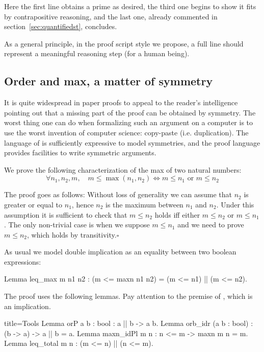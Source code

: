 Here the first line obtains a prime  as desired, the third
one begins to show it fits by contrapositive reasoning, and the
last one, already commented in section~\ref{sec:quantifiedst}, concludes.

As a general principle, in the proof script style we propose, a full
line should represent a meaningful reasoning step (for a human being).


\subsection{Order and max, a matter of symmetry}\label{sec:leqmax}

It is quite widespread in paper proofs to appeal to the reader's intelligence
pointing out that a missing part of the proof can be obtained by symmetry.
The worst thing one can do when formalizing such an argument on a computer
is to use the worst invention of computer science: copy-paste (i.e.
duplication).  The language of
\Coq{} is sufficiently expressive to model symmetries, and the
\mcbSSR{} proof language provides facilities to write symmetric arguments.

We prove the following characterization of the max of two natural numbers:
\[
\forall n_1, n_2, m, \quad m \le \max(n_1,n_2)
\Leftrightarrow m \le n_1 \textrm{ or } m \le n_2
\]

The proof goes as follows: Without loss of generality we can assume that
$n_2$ is greater or equal to $n_1$, hence $n_2$ is the maximum between
$n_1$ and $n_2$.  Under this assumption it is sufficient to check
that $m \le n_2$ holds iff either $m \le n_2$ or $m \le n_1$.
The only non-trivial case is when we suppose $m \le n_1$ and
we need to prove $m \le n_2$, which holds by transitivity.\hfill$\square$

As usual we model double implication as an equality between two
boolean expressions:

\begin{coq}{}{}
Lemma leq_max m n1 n2 : (m <= maxn n1 n2) = (m <= n1) || (m <= n2).
\end{coq}

The proof uses the following lemmas.  Pay attention to the premise of
, which is an implication.

\begin{coq}{}{title=Tools}
Lemma orP {a b : bool} : a || b -> a \/ b.
Lemma orb_idr (a b : bool) : (b -> a) -> a || b = a.
Lemma maxn_idPl {m n} : n <= m -> maxn m n = m.
Lemma leq_total m n : (m <= n) || (n <= m).
\end{coq}

